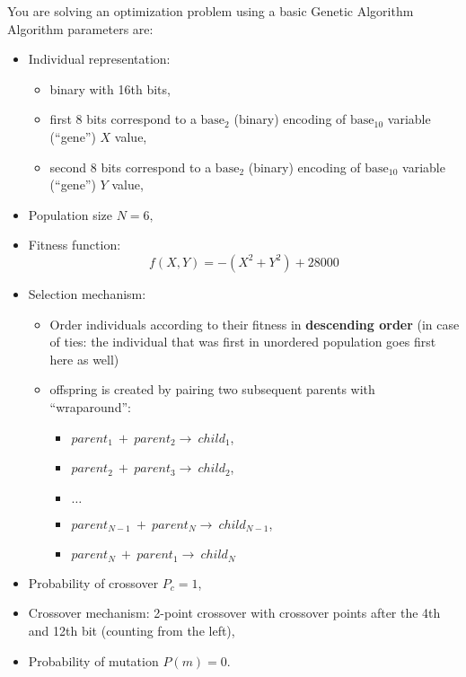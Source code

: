 \documentclass[assignment={1},
duedate={Saturday, February 10, 2024, 11:59 PM CST},
points={30}]{cs581homework}
\begin{document}
You are solving an optimization problem using a basic Genetic Algorithm
Algorithm parameters are:
\begin{itemize}
	\item Individual representation:
	\begin{itemize}
		\item binary with 16th bits,
		\item first 8 bits correspond to a $\mbox{base}_{2}$ (binary) encoding of $\mbox{base}_{10}$ variable (``gene'') $X$ value,
		\item second 8 bits correspond to a $\mbox{base}_{2}$ (binary) encoding of $\mbox{base}_{10}$ variable (``gene'') $Y$ value,
	\end{itemize}
	\item Population size $N=6,$
	\item Fitness function: \[ f(X, Y) = -\left( X^{2} + Y^{2} \right) + 28000 \]
	\item Selection mechanism:
	\begin{itemize}
		\item Order individuals according to their fitness in \textbf{descending order} (in case of ties: the individual that was first in unordered population goes first here as well)
		\item offspring is created by pairing two subsequent parents with ``wraparound'':
		\begin{itemize}
			\item $parent_{1}\ +\ parent_{2} \rightarrow\ child_{1}$,
			\item $parent_{2}\ +\ parent_{3} \rightarrow\ child_{2}$,
			\item $\dots$
			\item $parent_{N-1}\ +\ parent_{N} \rightarrow\ child_{N-1}$,
			\item $parent_{N}\ +\ parent_{1} \rightarrow\ child_{N}$
		\end{itemize}
	\end{itemize}
	\item Probability of crossover $P_{c}=1$,
	\item Crossover mechanism: 2-point crossover with crossover points after the 4th and 12th bit (counting from the left),
	\item Probability of mutation $P(m)=0$.
\end{itemize}
\end{document}
